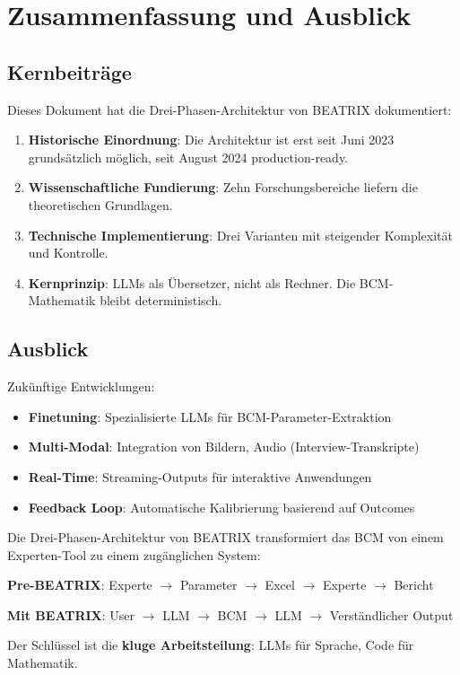 \documentclass[12pt,a4paper]{article}
\begin{document}
\section{Zusammenfassung und Ausblick}

\subsection{Kernbeiträge}

Dieses Dokument hat die Drei-Phasen-Architektur von BEATRIX dokumentiert:

\begin{enumerate}
    \item \textbf{Historische Einordnung}: Die Architektur ist erst seit Juni 2023 grundsätzlich möglich, seit August 2024 production-ready.

    \item \textbf{Wissenschaftliche Fundierung}: Zehn Forschungsbereiche liefern die theoretischen Grundlagen.

    \item \textbf{Technische Implementierung}: Drei Varianten mit steigender Komplexität und Kontrolle.

    \item \textbf{Kernprinzip}: LLMs als Übersetzer, nicht als Rechner. Die BCM-Mathematik bleibt deterministisch.
\end{enumerate}

\subsection{Ausblick}

Zukünftige Entwicklungen:

\begin{itemize}
    \item \textbf{Finetuning}: Spezialisierte LLMs für BCM-Parameter-Extraktion
    \item \textbf{Multi-Modal}: Integration von Bildern, Audio (Interview-Transkripte)
    \item \textbf{Real-Time}: Streaming-Outputs für interaktive Anwendungen
    \item \textbf{Feedback Loop}: Automatische Kalibrierung basierend auf Outcomes
\end{itemize}

\begin{tcolorbox}[colback=green!5!white, colframe=green!75!black, title=Schlussfolgerung]
Die Drei-Phasen-Architektur von BEATRIX transformiert das BCM von einem Experten-Tool zu einem zugänglichen System:

\textbf{Pre-BEATRIX}: Experte $\rightarrow$ Parameter $\rightarrow$ Excel $\rightarrow$ Experte $\rightarrow$ Bericht

\textbf{Mit BEATRIX}: User $\rightarrow$ LLM $\rightarrow$ BCM $\rightarrow$ LLM $\rightarrow$ Verständlicher Output

Der Schlüssel ist die \textbf{kluge Arbeitsteilung}: LLMs für Sprache, Code für Mathematik.
\end{tcolorbox}
\end{document}
